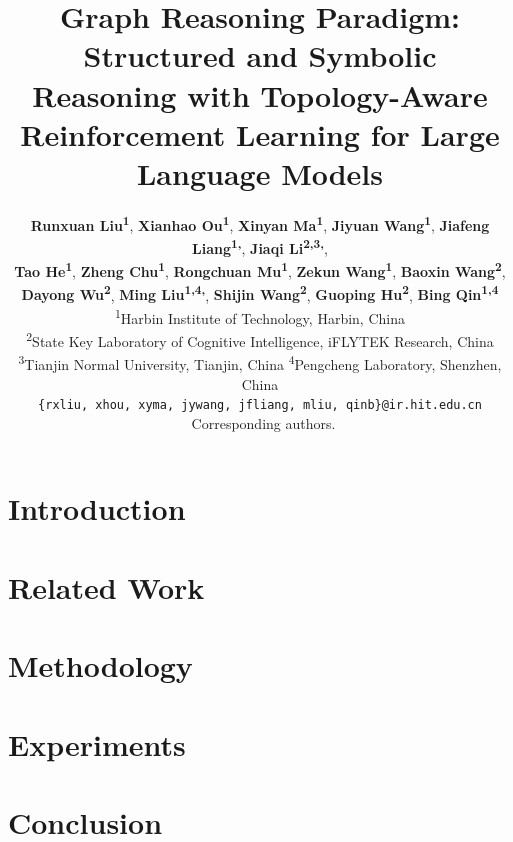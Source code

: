 \documentclass[11pt]{article}
\title{Graph Reasoning Paradigm: Structured and Symbolic Reasoning with Topology-Aware Reinforcement Learning for Large Language Models}
\author{
  \textbf{Runxuan Liu\textsuperscript{1}},
  \textbf{Xianhao Ou\textsuperscript{1}},
  \textbf{Xinyan Ma\textsuperscript{1}},
  \textbf{Jiyuan Wang\textsuperscript{1}},
  \textbf{Jiafeng Liang\textsuperscript{1,\textdagger}},
  \textbf{Jiaqi Li\textsuperscript{2,3,\textdagger}},\\
  \textbf{Tao He\textsuperscript{1}},
  \textbf{Zheng Chu\textsuperscript{1}},
  \textbf{Rongchuan Mu\textsuperscript{1}},
  \textbf{Zekun Wang\textsuperscript{1}},
  \textbf{Baoxin Wang\textsuperscript{2}},\\
  \textbf{Dayong Wu\textsuperscript{2}},
  \textbf{Ming Liu\textsuperscript{1,4,\textdagger}},
  \textbf{Shijin Wang\textsuperscript{2}},
  \textbf{Guoping Hu\textsuperscript{2}},
  \textbf{Bing Qin\textsuperscript{1,4}}\\
  \textsuperscript{1}Harbin Institute of Technology, Harbin, China\\
  \textsuperscript{2}State Key Laboratory of Cognitive Intelligence, iFLYTEK Research, China\\
  \textsuperscript{3}Tianjin Normal University, Tianjin, China
  \textsuperscript{4}Pengcheng Laboratory, Shenzhen, China\\[-0.3em]
  \small\quad\texttt{\{rxliu, xhou, xyma, jywang, jfliang, mliu, qinb\}@ir.hit.edu.cn}\\[-0.3em]
  \small\textdagger\ Corresponding authors.\\
}
\begin{document}
\maketitle
\begin{abstract}

\end{abstract}

\section{Introduction}


\section{Related Work}


\section{Methodology}


\section{Experiments}


\section{Conclusion}

\end{document}
